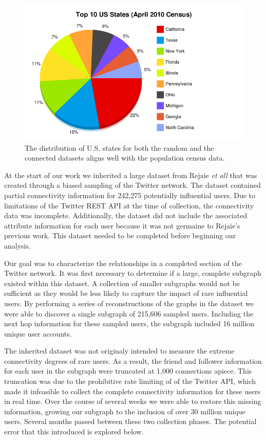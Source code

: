 \begin{figure}[t]
 \includegraphics[bb=0 0 800 500,scale=.2]{./images/loca-actu.png}
\caption{The distribution of U.S. states for both the random and the connected datasets aligns well with the population census data.}
\label{fig:loca-actu}
\end{figure}

At the start of our work we inherited a large dataset from Rejaie \textit{et all} that was created through a biased sampling of the Twitter network.  The dataset contained partial connectivity information for 242,275 potentially influential users.  Due to limitations of the Twitter REST API at the time of collection, the connectivity data was incomplete.  Additionally, the dataset did not include the associated attribute information for each user because it was not germaine to Rejaie's previous work.  This dataset needed to be completed before beginning our analysis.

Our goal was to characterize the relationships in a completed section of the Twitter network.  It was first necessary to determine if a large, complete subgraph existed within this dataset.  A collection of smaller subgraphs would not be sufficient as they would be less likely to capture the impact of rare influential users.  By performing a series of reconstructions of the graphs in the dataset we were able to discover a single subgraph of 215,606 sampled users.  Including the next hop information for these sampled users, the subgraph included 16 million unique user accounts.

The inherited dataset was not originaly intended to measure the extreme connectivity degrees of rare users.  As a result, the friend and follower information for each user in the subgraph were truncated at 1,000 connections apiece.  This truncation was due to the prohibitive rate limiting of of the Twitter API, which made it infeasible to collect the complete connectivity information for these users in real time.  Over the course of several weeks we were able to restore this missing information, growing our subgraph to the inclusion of over 30 million unique users.  Several months passed between these two collection phases.  The potential error that this introduced is explored below.

